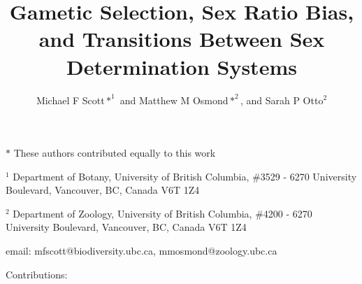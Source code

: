 \documentclass[12pt]{article}
\begin{document}
\title{Gametic Selection, Sex Ratio Bias, and Transitions Between Sex Determination Systems}
\author{Michael F Scott$*^1$ and Matthew M Osmond$*^2$, and Sarah P Otto$^2$}
\date{}
\maketitle
\noindent
$*$ These authors contributed equally to this work

\noindent
$^1$ Department of Botany, University of British Columbia, \#3529 - 6270 University Boulevard, Vancouver, BC, Canada V6T 1Z4

\noindent
$^2$ Department of Zoology, University of British Columbia, \#4200 - 6270 University Boulevard, Vancouver, BC, Canada V6T 1Z4

\noindent
email: mfscott@biodiversity.ubc.ca, mmosmond@zoology.ubc.ca

\noindent
Contributions: 

\newpage
\linenumbers
\modulolinenumbers[2]
\end{document}
